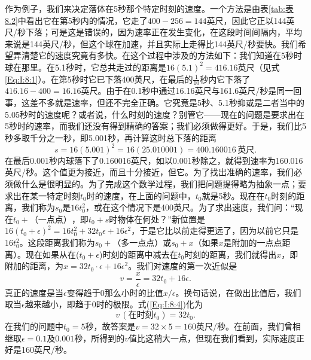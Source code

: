 \documentclass[12pt,oneside]{book}
\begin{document}
作为例子，我们来决定落体在5秒那个特定时刻的速度。一个方法是由表\ref{tab:表8.2}中看出它在第5秒内的情况，它走了$400-256=144$英尺，因此它正以144英尺/秒下落；可是这是错误的，因为速率正在发生变化，在这段时间间隔内，平均来说是144英尺/秒，但这个球在加速，并且实际上走得比144英尺/秒要快。我们希望弄清楚它的速度究竟有多快。在这个过程中涉及的方法如下：我们知道在5秒时球在那里。在5.1秒时，它总共走过的距离是$16(5.1)^2=416.16$英尺（见式\ref{Eq:I:8:1}）。在第5秒时它已下落400英尺，在最后的$\frac{1}{10}$秒内它下落了$416.16-400=16.16$英尺。由于在0.1秒中通过16.16英尺与161.6英尺/秒是同一回事，这差不多就是速率，但还不完全正确。它究竟是5秒、5.1秒抑或是二者当中的5.05秒时的速度呢？或者说，什么时刻的速度？别管它——现在的问题是要求出在5秒时的速率，而我们还没有得到精确的答案；我们必须做得更好。于是，我们比5秒多取千分之一秒，即5.001秒，再计算这时总下落的距离
\begin{equation*}
s=16(5.001)^2=16(25.010001)=400.160016 \,\textrm{英尺}.
\end{equation*}
在最后0.001秒内球落下了0.160016英尺，如以0.001秒除之，就得到速率为160.016英尺/秒。这个值更为接近，而且十分接近，但它。为了找出准确的速率，我们必须做什么是很明显的。为了完成这个数学过程，我们把问题提得略为抽象一点；要求出在某一特定时刻$t_0$时的速度，在上面的问题中，$t_0$就是5秒。现在在$t_0$时刻的距离，我们称为$s_0$是$16t_0^2$，或在这个情况下是400英尺。为了求出速度，我们问：“现在$t_0+\textrm{（一点点）}$，即$t_0+s$时物体在何处？”新位置是$16(t_0+\epsilon)^2=16t_0^2+32t_0\epsilon+16\epsilon^2$，于是它比以前走得更远了，因为以前它只是$16t_0^2$。这段距离我们称为$s_0+\textrm{（多一点点）}$或$s_0+x$（如果$x$是附加的一点点距离）。现在如果从在($t_0+\epsilon$)时刻的距离中减去在$t_0$时刻的距离，我们就得出$x$，即附加的距离，为$x=32t_0\cdot\epsilon+16\epsilon^2$。我们对速度的第一次近似是
\begin{equation}
\label{Eq:I:8:4}
v=\frac{x}{\epsilon}=32t_0+16\epsilon.
\end{equation}
真正的速度是当$\epsilon$变得趋于0那么小时的比值$x/\epsilon$。换句话说，在做出比值后，我们取当$\epsilon$越来越小，即趋于0时的极限。式(\ref{Eq:I:8:4})化为
\begin{equation*}
v\,(\textrm{在时刻$t_0$})=32t_0.
\end{equation*}
在我们的问题中$t_0=5$秒，故答案是$v=32\times5=160$英尺/秒。在前面，我们曾相继取$\epsilon=0.1$及$0.001$秒，所得到的$v$值比这稍大一点，但现在我们看到，实际速度正好是160英尺/秒。
\end{document}
